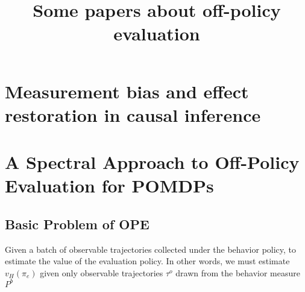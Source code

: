 \documentclass{article}
\title{Some papers about off-policy evaluation}
\begin{document}
\maketitle

\section{Measurement bias and effect restoration in causal inference}

\section{A Spectral Approach to Off-Policy Evaluation for POMDPs}
\subsection{Basic Problem of OPE}
Given a batch of observable trajectories collected under the behavior policy, to estimate the value of the evaluation policy. 
In other words, we must estimate $v_H(\pi_e)$ given only observable trajectories $\tau^o$ drawn from the behavior measure $P^b$
\end{document}
